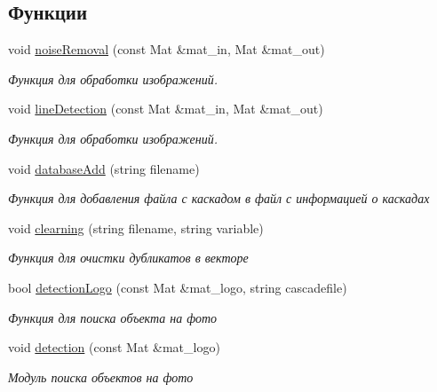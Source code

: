\subsection*{Функции}
\begin{DoxyCompactItemize}
\item 
void \mbox{\hyperlink{group__corecpp_gab8ed3baad2f1d9b6b82bf74da9dd3d3a}{noise\+Removal}} (const Mat \&mat\+\_\+in, Mat \&mat\+\_\+out)
\begin{DoxyCompactList}\small\item\em Функция для обработки изображений. \end{DoxyCompactList}\item 
void \mbox{\hyperlink{group__corecpp_ga9e277d82296b5ed9eda6266d8dcc24a3}{line\+Detection}} (const Mat \&mat\+\_\+in, Mat \&mat\+\_\+out)
\begin{DoxyCompactList}\small\item\em Функция для обработки изображений. \end{DoxyCompactList}\item 
void \mbox{\hyperlink{group__corecpp_ga10a0271bceabc9c1a0d736ab93113212}{database\+Add}} (string filename)
\begin{DoxyCompactList}\small\item\em Функция для добавления файла с каскадом в файл с информацией о каскадах \end{DoxyCompactList}\item 
void \mbox{\hyperlink{group__corecpp_ga78cdbfbe907847e78cfb387df76d99f9}{clearning}} (string filename, string variable)
\begin{DoxyCompactList}\small\item\em Функция для очистки дубликатов в векторе \end{DoxyCompactList}\item 
bool \mbox{\hyperlink{group__corecpp_ga76b0b7de3d9fa0de10d66740466ebc14}{detection\+Logo}} (const Mat \&mat\+\_\+logo, string cascadefile)
\begin{DoxyCompactList}\small\item\em Функция для поиска объекта на фото \end{DoxyCompactList}\item 
void \mbox{\hyperlink{group__corecpp_gae99907f19e7f09055012f68347a57d05}{detection}} (const Mat \&mat\+\_\+logo)
\begin{DoxyCompactList}\small\item\em Модуль поиска объектов на фото \end{DoxyCompactList}\item 

\end{DoxyCompactItemize}
